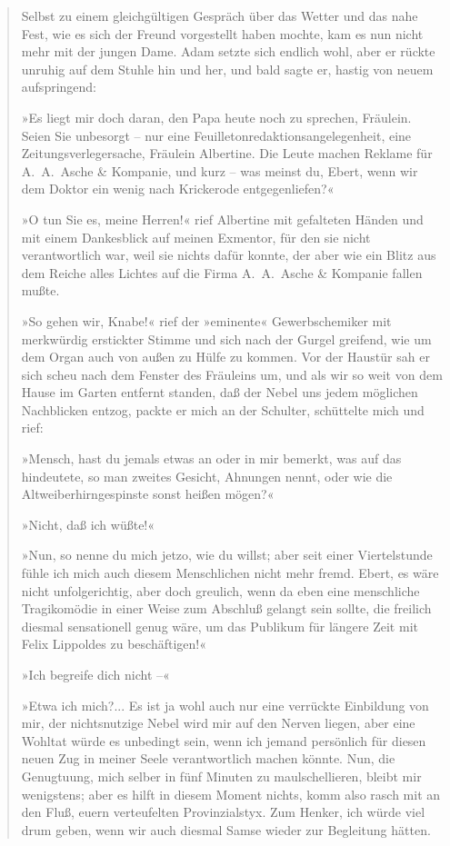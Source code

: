 \begin{verse}
Selbst zu einem gleichgültigen Gespräch über das Wetter und das
nahe Fest, wie es sich der Freund vorgestellt haben mochte, kam es
nun nicht mehr mit der jungen Dame. Adam setzte sich endlich wohl,
aber er rückte unruhig auf dem Stuhle hin und her, und bald sagte
er, hastig von neuem aufspringend:

»Es liegt mir doch daran, den Papa heute noch zu sprechen,
Fräulein. Seien Sie unbesorgt – nur eine
Feuilletonredaktionsangelegenheit, eine Zeitungsverlegersache,
Fräulein Albertine. Die Leute machen Reklame für A.~A.~Asche \&
Kompanie, und kurz – was meinst du, Ebert, wenn wir dem Doktor ein
wenig nach Krickerode entgegenliefen?«

»O tun Sie es, meine Herren!« rief Albertine mit gefalteten Händen
und mit einem Dankesblick auf meinen Exmentor, für den sie nicht
verantwortlich war, weil sie nichts dafür konnte, der aber wie ein
Blitz aus dem Reiche alles Lichtes auf die Firma A.~A.~Asche \&
Kompanie fallen mußte.

»So gehen wir, Knabe!« rief der »eminente« Gewerbschemiker mit
merkwürdig erstickter Stimme und sich nach der Gurgel greifend, wie
um dem Organ auch von außen zu Hülfe zu kommen. Vor der Haustür sah
er sich scheu nach dem Fenster des Fräuleins um, und als wir so
weit von dem Hause im Garten entfernt standen, daß der Nebel uns
jedem möglichen Nachblicken entzog, packte er mich an der Schulter,
schüttelte mich und rief:

»Mensch, hast du jemals etwas an oder in mir bemerkt, was auf das
hindeutete, so man zweites Gesicht, Ahnungen nennt, oder wie die
Altweiberhirngespinste sonst heißen mögen?«

»Nicht, daß ich wüßte!«

»Nun, so nenne du mich jetzo, wie du willst; aber seit einer
Viertelstunde fühle ich mich auch diesem Menschlichen nicht mehr
fremd. Ebert, es wäre nicht unfolgerichtig, aber doch greulich,
wenn da eben eine menschliche Tragikomödie in einer Weise zum
Abschluß gelangt sein sollte, die freilich diesmal sensationell
genug wäre, um das Publikum für längere Zeit mit Felix Lippoldes zu
beschäftigen!«

»Ich begreife dich nicht –«

»Etwa ich mich?... Es ist ja wohl auch nur eine verrückte
Einbildung von mir, der nichtsnutzige Nebel wird mir auf den Nerven
liegen, aber eine Wohltat würde es unbedingt sein, wenn ich jemand
persönlich für diesen neuen Zug in meiner Seele verantwortlich
machen könnte. Nun, die Genugtuung, mich selber in fünf Minuten zu
maulschellieren, bleibt mir wenigstens; aber es hilft in diesem
Moment nichts, komm also rasch mit an den Fluß, euern verteufelten
Provinzialstyx. Zum Henker, ich würde viel drum geben, wenn wir
auch diesmal Samse wieder zur Begleitung hätten.


\end{verse}
